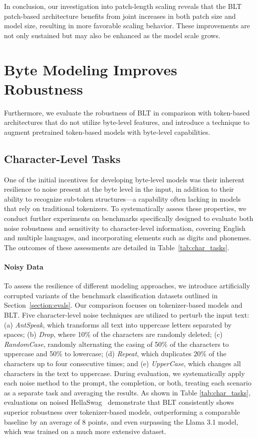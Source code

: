 In conclusion, our investigation into patch-length scaling reveals that the {\textsc BLT} patch-based architecture benefits from joint increases in both patch size and model size, resulting in more favorable scaling behavior. These improvements are not only sustained but may also be enhanced as the model scale grows.

\section{Byte Modeling Improves Robustness} Furthermore, we evaluate the robustness of {\textsc BLT} in comparison with token-based architectures that do not utilize byte-level features, and introduce a technique to augment pretrained token-based models with byte-level capabilities.
\label{sec:robustness}

\subsection{Character-Level Tasks}

One of the initial incentives for developing byte-level models was their inherent resilience to noise present at the byte level in the input, in addition to their ability to recognize sub-token structures—a capability often lacking in models that rely on traditional tokenizers. To systematically assess these properties, we conduct further experiments on benchmarks specifically designed to evaluate both noise robustness and sensitivity to character-level information, covering English and multiple languages, and incorporating elements such as digits and phonemes. The outcomes of these assessments are detailed in Table~\ref{tab:char_tasks}.

\paragraph{Noisy Data} To assess the resilience of different modeling approaches, we introduce artificially corrupted variants of the benchmark classification datasets outlined in Section~\ref{section:evals}. Our comparison focuses on tokenizer-based models and {\textsc BLT}. Five character-level noise techniques are utilized to perturb the input text: (a) \textit{AntSpeak}, which transforms all text into uppercase letters separated by spaces; (b) \textit{Drop}, where 10\% of the characters are randomly deleted; (c) \textit{RandomCase}, randomly alternating the casing of 50\% of the characters to uppercase and 50\% to lowercase; (d) \textit{Repeat}, which duplicates 20\% of the characters up to four consecutive times; and (e) \textit{UpperCase}, which changes all characters in the text to uppercase. During evaluation, we systematically apply each noise method to the prompt, the completion, or both, treating each scenario as a separate task and averaging the results. As shown in Table \ref{tab:char_tasks}, evaluations on noised HellaSwag~\citep{Eval_hellaswag} demonstrate that {\textsc BLT} consistently shows superior robustness over tokenizer-based models, outperforming a comparable baseline by an average of 8 points, and even surpassing the Llama 3.1 model, which was trained on a much more extensive dataset.

